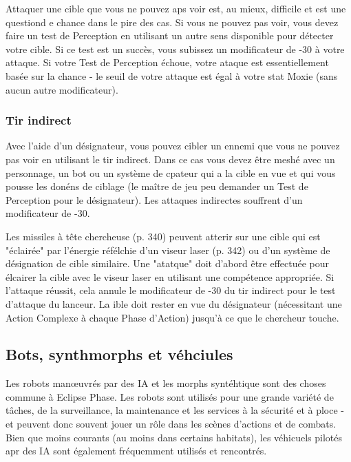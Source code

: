 Attaquer une cible que vous ne pouvez aps voir est, au mieux, difficile et est une questiond e chance dans le pire des cas. Si vous ne pouvez pas voir, vous devez faire un test de Perception en utilisant un autre sens disponible pour détecter votre cible. Si ce test est un succès, vous subissez un modificateur de -30 à votre attaque. Si votre Test de Perception échoue, votre ataque est essentiellement basée sur la chance - le seuil de votre attaque est égal à votre stat Moxie (sans aucun autre modificateur). 

\subsubsection{Tir indirect} 

Avec l'aide d'un désignateur, vous pouvez cibler un ennemi que vous ne pouvez pas voir en utilisant le tir indirect. Dans ce cas vous devez être meshé avec un personnage, un bot ou un système de cpateur qui a la cible en vue et qui vous pousse les donéns de ciblage (le maître de jeu peu demander un Test de Perception pour le désignateur). Les attaques indirectes souffrent d'un modificateur de -30. 

Les missiles à tête chercheuse (p. 340) peuvent atterir sur une cible qui est "éclairée" par l'énergie réfélchie d'un viseur laser (p. 342) ou d'un système de désignation de cible similaire. Une "atatque" doit d'abord être effectuée pour élcairer la cible avec le viseur laser en utilisant une compétence appropriée. Si l'attaque réussit, cela annule le modificateur de -30 du tir indirect pour le test d'attaque du lanceur. La ible doit rester en vue du désignateur (nécessitant une Action Complexe à chaque Phase d'Action) jusqu'à ce que le chercheur touche. 



\subsection{Bots, synthmorphs et véhciules} \label{sec:bots-synthmorphs-vehicles} 

Les robots manœuvrés par des IA et les morphs syntéhtique sont des choses commune à Eclipse Phase. Les robots sont utilisés pour une grande variété de tâches, de la surveillance, la maintenance et les services à la sécurité et à ploce - et peuvent donc souvent jouer un rôle dans les scènes d'actions et de combats. Bien que moins courants (au moins dans certains habitats), les véhicuels pilotés apr des IA sont également fréquemment utilisés et rencontrés. 

